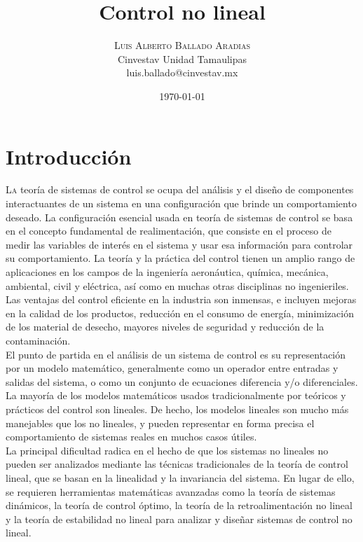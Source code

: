 \documentclass[oneside,onecolumn]{article}
\title{Control no lineal} %
\author{%
\textsc{Luis Alberto Ballado Aradias} \\%
\normalsize Cinvestav Unidad Tamaulipas \\ %
\normalsize {luis.ballado@cinvestav.mx} %
}
\date{\today} %
\begin{document}
\maketitle

\section{Introducción}

\lettrine[nindent=0em,lines=3]{L}a teoría de sistemas de control se ocupa del análisis y el diseño de componentes interactuantes de un sistema en una configuración que brinde un comportamiento deseado. La configuración esencial usada en teoría de sistemas de control se basa en el concepto fundamental de realimentación, que consiste en el proceso de medir las variables de interés en el sistema y usar esa información para controlar su comportamiento. La teoría y la práctica del control tienen un amplio rango de aplicaciones en los campos de la ingeniería aeronáutica, química, mecánica, ambiental, civil y eléctrica, así como en muchas otras disciplinas no ingenieriles. Las ventajas del control eficiente en la industria son inmensas, e incluyen mejoras en la calidad de los productos, reducción en el consumo de energía, minimización de los material de desecho, mayores niveles de seguridad y reducción de la contaminación.\\

El punto de partida en el análisis de un sistema de control es su representación por un modelo matemático, generalmente como un operador entre entradas y salidas del sistema, o como un conjunto de ecuaciones diferencia y/o diferenciales. La mayoría de los modelos matemáticos usados tradicionalmente por teóricos y prácticos del control son lineales. De hecho, los modelos lineales son mucho más manejables que los no lineales, y pueden representar en forma precisa el comportamiento de sistemas reales en muchos casos útiles.\\

La principal dificultad radica en el hecho de que los sistemas no lineales no pueden ser analizados mediante las técnicas tradicionales de la teoría de control lineal, que se basan en la linealidad y la invariancia del sistema. En lugar de ello, se requieren herramientas matemáticas avanzadas como la teoría de sistemas dinámicos, la teoría de control óptimo, la teoría de la retroalimentación no lineal y la teoría de estabilidad no lineal para analizar y diseñar sistemas de control no lineal.\\
\end{document}
